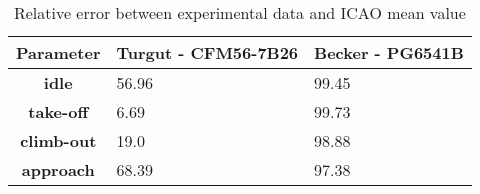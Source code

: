 \begin{table}[h!]
  \centering
  \begin{tabularx}{\textwidth}{||c|X|X||}
  \hline
    \cellcolor{gray!20}\textbf{Parameter} & \cellcolor{gray!20}\textbf{Turgut - CFM56-7B26} & \cellcolor{gray!20}\textbf{Becker - PG6541B} \\ [0.5ex]
  \hline\hline
\centering
    \cellcolor{gray!20}\textbf{idle} & 56.96 & 99.45 \\
  \hline
    \cellcolor{gray!20}\textbf{take-off} & 6.69 & 99.73 \\
  \hline
    \cellcolor{gray!20}\textbf{climb-out} & 19.0 & 98.88 \\
  \hline
    \cellcolor{gray!20}\textbf{approach} & 68.39 & 97.38 \\
  \hline
  \end{tabularx}
  \caption{Relative error between experimental data and ICAO mean value}
  \label{tab:relee}
\end{table}
